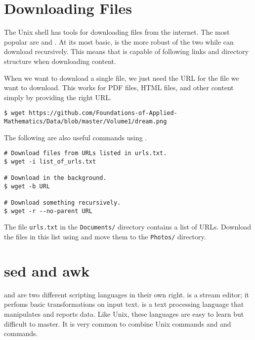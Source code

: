 \section*{Downloading Files} %

The Unix shell has tools for downloading files from the internet.
The most popular are  and .
At its most basic,  is the more robust of the two while  can download recursively. 
This means that  is capable of following links and directory structure when downloading content.


When we want to download a single file, we just need the URL for the file we want to download.
This works for PDF files, HTML files, and other content simply by providing the right URL.

\begin{lstlisting}
$ wget https://github.com/Foundations-of-Applied-Mathematics/Data/blob/master/Volume1/dream.png
\end{lstlisting}

The following are also useful commands using .

\begin{lstlisting}
# Download files from URLs listed in urls.txt.
$ wget -i list_of_urls.txt

# Download in the background.
$ wget -b URL

# Download something recursively.
$ wget -r --no-parent URL
\end{lstlisting}

\begin{problem}
The file \texttt{urls.txt} in the \texttt{Documents/} directory contains a list of URLs.
Download the files in this list using  and move them to the \texttt{Photos/} directory.
\end{problem}

\section*{sed and awk} %

 and  are two different scripting languages in their own right.
 is a stream editor; it perfoms basic transformations on input text.
 is a text processing language that manipulates and reports data.
Like Unix, these languages are easy to learn but difficult to master.
It is very common to combine Unix commands and  and  commands.

